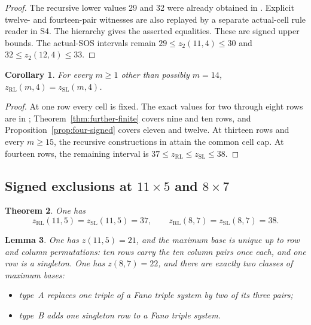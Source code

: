 \documentclass[11pt,a4paper]{article}
\newtheorem{theorem}{Theorem}[section]
\newtheorem{lemma}[theorem]{Lemma}
\newtheorem{corollary}[theorem]{Corollary}
\theoremstyle{definition}
\newcommand{\zr}{z_{\mathrm{RL}}}
\newcommand{\zs}{z_{\mathrm{SL}}}
\newcommand{\zt}{z_2}
\begin{document}
\begin{proof}
The recursive lower values 29 and 32 were already obtained in \cite{CC}.
Explicit twelve- and fourteen-pair witnesses are also replayed by a separate
actual-cell rule reader in S4. The hierarchy gives the asserted equalities.
These are signed upper bounds. The actual-SOS intervals remain
$29\le\zt(11,4)\le30$ and $32\le\zt(12,4)\le33$.
\end{proof}

\begin{corollary}\label{cor:four-exception}
For every $m\ge1$ other than possibly $m=14$,
$\zr(m,4)=\zs(m,4)$.
\end{corollary}
\begin{proof}
At one row every cell is fixed. The exact values for two through eight rows
are in \cite{LQ,XY};
Theorem~\ref{thm:further-finite} covers nine and ten rows, and
Proposition~\ref{prop:four-signed} covers eleven and twelve.
At thirteen rows and every $m\ge15$, the recursive constructions
in \cite[Table~1 and Theorem~1.1]{CC} attain the common cell cap. At fourteen rows, the
remaining interval is $37\le\zr\le\zs\le38$.
\end{proof}


\subsection{Signed exclusions at \texorpdfstring{$11\times5$}{11x5} and \texorpdfstring{$8\times7$}{8x7}}\label{sec:signed-exclusions}

\begin{theorem}\label{thm:signed-exclusions}
One has
\[
 \zr(11,5)=\zs(11,5)=37,\qquad \zr(8,7)=\zs(8,7)=38 .
\]
\end{theorem}

\begin{lemma}\label{lem:bases-11-5-8-7}
One has $z(11,5)=21$, and the maximum base is unique up to row and
column permutations: ten rows carry the ten column pairs once each, and
one row is a singleton.
One has $z(8,7)=22$, and there are exactly two classes of maximum bases:
\begin{itemize}
\item type~A replaces one triple of a Fano triple system by two of its
      three pairs;
\item type~B adds one singleton row to a Fano triple system.
\end{itemize}
\end{lemma}
\end{document}
